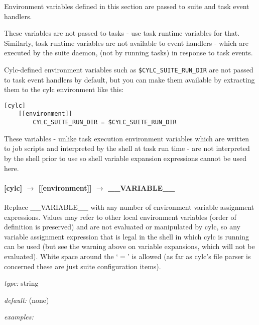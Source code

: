 Environment variables defined in this section are passed to suite and
task event handlers.

\begin{myitemize}
    \item These variables are not passed to tasks - use task runtime
        variables for that. Similarly, task runtime variables are not
        available to event handlers - which are executed by the suite daemon,
        (not by running tasks) in response to task events.
        
    \item Cylc-defined environment variables such as
        \lstinline=$CYLC_SUITE_RUN_DIR= are not passed to task event
        handlers by default, but you can make them available by
        extracting them to the cylc environment like this:
\begin{lstlisting}
[cylc]
    [[environment]]
        CYLC_SUITE_RUN_DIR = $CYLC_SUITE_RUN_DIR
\end{lstlisting}

    \item These variables - unlike task execution environment variables
        which are written to job scripts and interpreted by the shell at
        task run time - are not interpreted by the shell prior to use
        so shell variable expansion expressions cannot be used here.
\end{myitemize}

\paragraph[\_\_VARIABLE\_\_ ]{[cylc] $\rightarrow$ [[environment]] $\rightarrow$ \_\_VARIABLE\_\_}

Replace \_\_VARIABLE\_\_ with any number of environment variable
assignment expressions.
Values may refer to other local environment variables (order of
definition is preserved) and are not evaluated or manipulated by
cylc, so any variable assignment expression that is legal in the
shell in which cylc is running can be used (but see the warning
above on variable expansions, which will not be evaluated).
White space around the `$=$' is allowed (as far as cylc's file 
parser is concerned these are just suite configuration items).

\begin{myitemize}
    \item {\em type:} string
    \item {\em default:} (none)
    \item {\em examples:}
\end{myitemize}


